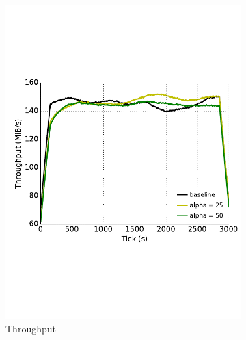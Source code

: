 \begin{figure}
\begin{subfigure}[t]{0.32\textwidth}
\includegraphics[trim={0 3cm 0 3cm}, clip, width=1.0\textwidth]{images/modifier_pr50_all.pdf}
		\caption{Throughput}
\label{fig:modifier_pr50_all}
	\end{subfigure}
	\begin{subfigure}[t]{0.32\textwidth} \centering

\end{subfigure}
\end{figure}
